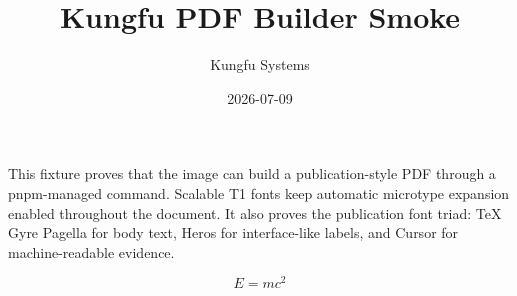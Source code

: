 \documentclass{article}
\title{Kungfu PDF Builder Smoke}
\author{Kungfu Systems}
\date{2026-07-09}
\begin{document}
\maketitle

This fixture proves that the image can build a publication-style PDF through a
pnpm-managed command. Scalable T1 fonts keep automatic microtype expansion
enabled throughout the document. It also proves the publication font triad:
TeX Gyre Pagella for body text, {\sffamily Heros for interface-like labels},
and {\ttfamily Cursor for machine-readable evidence}.

\[
  E = mc^2
\]
\end{document}
